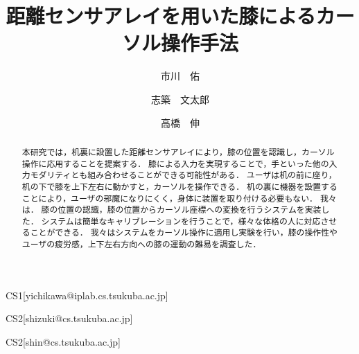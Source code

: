\documentclass[submit, techrep]{ipsj}
\begin{document}
\title{距離センサアレイを用いた膝によるカーソル操作手法}






\author{市川　佑}{}{CS1}[yichikawa@iplab.cs.tsukuba.ac.jp]
\author{志築　文太郎}{}{CS2}[shizuki@cs.tsukuba.ac.jp]
\author{高橋　伸}{}{CS2}[shin@cs.tsukuba.ac.jp]

\begin{abstract}
本研究では，机裏に設置した距離センサアレイにより，膝の位置を認識し，カーソル操作に応用することを提案する．
膝による入力を実現することで，手といった他の入力モダリティとも組み合わせることができる可能性がある．
ユーザは机の前に座り，机の下で膝を上下左右に動かすと，カーソルを操作できる．
机の裏に機器を設置することにより，ユーザの邪魔になりにくく，身体に装置を取り付ける必要もない．
我々は．
膝の位置の認識，膝の位置からカーソル座標への変換を行うシステムを実装した．
システムは簡単なキャリブレーションを行うことで，様々な体格の人に対応させることができる．
我々はシステムをカーソル操作に適用し実験を行い，膝の操作性やユーザの疲労感，上下左右方向への膝の運動の難易を調査した．
\end{abstract}






\maketitle

\end{document}

